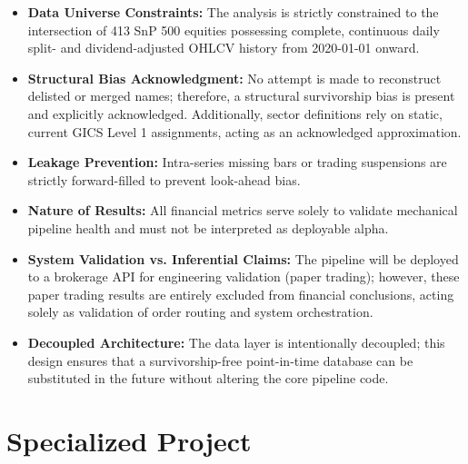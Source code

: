 \begin{itemize}
    \item \textbf{Data Universe Constraints:} The analysis is strictly constrained to the intersection of 413 \ac{SnP} 500 equities possessing complete, continuous daily split- and dividend-adjusted \ac{OHLCV} history from 2020-01-01 onward.
    \item \textbf{Structural Bias Acknowledgment:} No attempt is made to reconstruct delisted or merged names; therefore, a structural survivorship bias is present and explicitly acknowledged. Additionally, sector definitions rely on static, current \ac{GICS} Level 1 assignments, acting as an acknowledged approximation.
    \item \textbf{Leakage Prevention:} Intra-series missing bars or trading suspensions are strictly forward-filled to prevent look-ahead bias.
    \item \textbf{Nature of Results:} All financial metrics serve solely to validate mechanical pipeline health and must not be interpreted as deployable alpha.
    \item \textbf{System Validation vs. Inferential Claims:} The pipeline will be deployed to a brokerage \ac{API} for engineering validation (paper trading); however, these paper trading results are entirely excluded from financial conclusions, acting solely as validation of order routing and system orchestration.
    \item \textbf{Decoupled Architecture:} The data layer is intentionally decoupled; this design ensures that a survivorship-free point-in-time database can be substituted in the future without altering the core pipeline code.
\end{itemize}

\section{Specialized Project}
